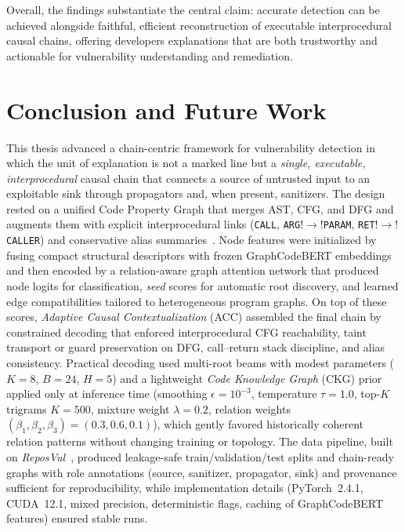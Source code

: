 \documentclass{buthesis}
\begin{document}
Overall, the findings substantiate the central claim: accurate detection can be achieved alongside faithful, efficient reconstruction of executable interprocedural causal chains, offering developers explanations that are both trustworthy and actionable for vulnerability understanding and remediation.



\chapter{Conclusion and Future Work}
\label{chap:conclusion}

This thesis advanced a chain-centric framework for vulnerability detection in which the unit of explanation is not a marked line but a \emph{single, executable, interprocedural} causal chain that connects a source of untrusted input to an exploitable sink through propagators and, when present, sanitizers. The design rested on a unified Code Property Graph that merges AST, CFG, and DFG and augments them with explicit interprocedural links (\texttt{CALL}, \texttt{ARG}$!\to!$\texttt{PARAM}, \texttt{RET}$!\to!$\texttt{CALLER}) and conservative alias summaries~\cite{yamaguchi2014cpg}. Node features were initialized by fusing compact structural descriptors with frozen GraphCodeBERT embeddings~\cite{guo2021graphcodebert} and then encoded by a relation-aware graph attention network that produced node logits for classification, \emph{seed} scores for automatic root discovery, and learned edge compatibilities tailored to heterogeneous program graphs. On top of these scores, \emph{Adaptive Causal Contextualization} (ACC) assembled the final chain by constrained decoding that enforced interprocedural CFG reachability, taint transport or guard preservation on DFG, call–return stack discipline, and alias consistency. Practical decoding used multi-root beams with modest parameters ($K{=}8$, $B{=}24$, $H{=}5$) and a lightweight \emph{Code Knowledge Graph} (CKG) prior applied only at inference time (smoothing $\epsilon{=}10^{-3}$, temperature $\tau{=}1.0$, top-$K$ trigrams $K{=}500$, mixture weight $\lambda{=}0.2$, relation weights $(\beta_1,\beta_2,\beta_3){=}(0.3,0.6,0.1)$), which gently favored historically coherent relation patterns without changing training or topology. The data pipeline, built on \emph{ReposVul}~\cite{wang2024reposvul}, produced leakage-safe train/validation/test splits and chain-ready graphs with role annotations (source, sanitizer, propagator, sink) and provenance sufficient for reproducibility, while implementation details (PyTorch~2.4.1, CUDA~12.1, mixed precision, deterministic flags, caching of GraphCodeBERT features) ensured stable runs.
\end{document}
